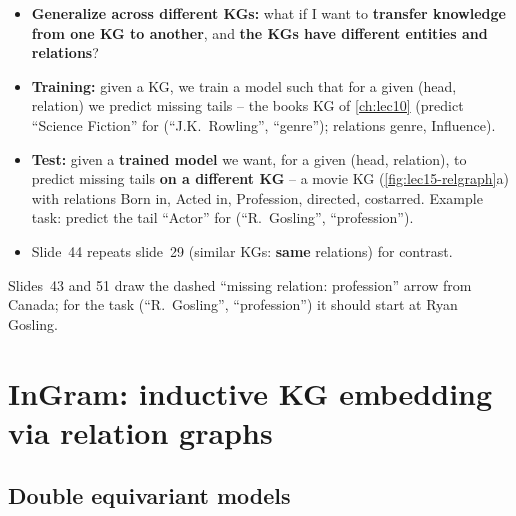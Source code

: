 \begin{itemize}
  \item \textbf{Generalize across different KGs:} what if I want to \textbf{transfer
    knowledge from one KG to another}, and \textbf{the KGs have different entities and
    relations}?
  \item \textbf{Training:} given a KG, we train a model such that for a given (head,
    relation) we predict missing tails -- the books KG of \cref{ch:lec10} (predict
    ``Science Fiction'' for (``J.K.\ Rowling'', ``genre''); relations genre, Influence).
  \item \textbf{Test:} given a \textbf{trained model} we want, for a given (head,
    relation), to predict missing tails \textbf{on a different KG} -- a movie KG
    (\cref{fig:lec15-relgraph}a) with relations Born in, Acted in, Profession, directed,
    costarred. Example task: predict the tail ``Actor'' for (``R.\ Gosling'',
    ``profession'').
  \item Slide~44 repeats slide~29 (similar KGs: \textbf{same} relations) for contrast.
\end{itemize}
\begin{caution}
  Slides~43 and 51 draw the dashed ``missing relation: profession'' arrow from Canada;
  for the task (``R.\ Gosling'', ``profession'') it should start at Ryan Gosling.
\end{caution}

\section{InGram: inductive KG embedding via relation graphs}\label{sec:lec15-ingram}

\subsection{Double equivariant models}\label{sec:lec15-de}

